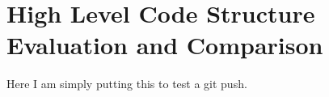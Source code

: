 \part{High Level Code Structure Evaluation and Comparison}
\label{part2}
Here I am simply putting this to test a git push. \cite{Hashim}

